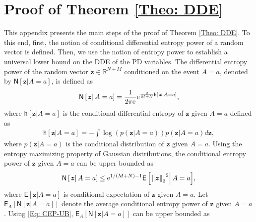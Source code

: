 \documentclass[10pt,twocolumn,twoside]{IEEEtran}
\begin{document}
\section{Proof of Theorem \ref{Theo: DDE}}\label{App: DDE}

This appendix presents the main steps of the proof of Theorem \ref{Theo: DDE}. To this end, first, the notion of conditional differential entropy power of a random vector is defined. Then, we use the notion of entropy power to establish a universal lower bound on the DDE of the PD variables. The differential entropy power of the random vector ${\ensuremath{\boldsymbol{{z}}}}\in {\ensuremath{{\ensuremath{\mathbb{{R}}}}}}^{N+M} $ conditioned on the event $A=a$, denoted by ${\ensuremath{\mathsf{N}\left[\left.{{\ensuremath{\boldsymbol{{z}}}}}\right|{A=a}\right]}}$, is defined as
\begin{eqnarray}
{\ensuremath{\mathsf{N}\left[\left.{{\ensuremath{\boldsymbol{{z}}}}}\right|{A=a}\right]}}=\frac{1}{{2\pi {\ensuremath{{\rm e}^{{}}}}}}{\ensuremath{{\rm e}^{{\frac{2}{M+N}{\ensuremath{\mathsf{h}\left[\left.{{\ensuremath{\boldsymbol{{z}}}}}\right|{A=a}\right]}}}}}},\nonumber
\end{eqnarray}
where ${\ensuremath{\mathsf{h}\left[\left.{{\ensuremath{\boldsymbol{{z}}}}}\right|{A=a}\right]}}$ is the conditional differential entropy of ${\ensuremath{\boldsymbol{{z}}}}$ given  $A=a$ defined as
\begin{eqnarray}
{\ensuremath{\mathsf{h}\left[\left.{{\ensuremath{\boldsymbol{{z}}}}}\right|{A=a}\right]}}=-\int{\ensuremath{\log{\left({{p{\left({\left.{\ensuremath{\boldsymbol{{z}}}}\right|A=a}\right)}}}\right)}}}p{\left({\left.{\ensuremath{\boldsymbol{{z}}}}\right|A=a}\right)}d{\ensuremath{\boldsymbol{{z}}}},\nonumber
\end{eqnarray}
where $p{\left({\left.{\ensuremath{\boldsymbol{{z}}}}\right|A=a}\right)}$ is the conditional distribution of ${\ensuremath{\boldsymbol{{z}}}}$ given $A=a$.
Using the entropy maximizing property of Gaussian distributions, the conditional entropy power of ${\ensuremath{\boldsymbol{{z}}}}$ given $A=a$ can be upper bounded \cite{NE04} as
\begin{eqnarray}\label{Eq: CEP-UB}
{\ensuremath{\mathsf{N}\left[\left.{{\ensuremath{\boldsymbol{{z}}}}}\right|{A=a}\right]}}\leq {\ensuremath{{\rm e}^{{1/{\left({M+N}\right)}-1}}}}{\ensuremath{\mathsf{E}\left[\left.{{\left\Vert{{\ensuremath{\boldsymbol{{z}}}}}\right\Vert_{{2}}}^2}\right|{A=a}\right]}},
\end{eqnarray}
where ${\ensuremath{\mathsf{E}\left[\left.{{\ensuremath{\boldsymbol{{z}}}}}\right|{A=a}\right]}}$ is conditional expectation of ${\ensuremath{\boldsymbol{{z}}}}$ given $A=a$. Let $\mathsf{E}_A\left[{\ensuremath{\mathsf{N}\left[\left.{{\ensuremath{\boldsymbol{{z}}}}}\right|{A=a}\right]}}\right]$ denote the average conditional entropy power of ${\ensuremath{\boldsymbol{{z}}}}$ given $A=a$. Using \eqref{Eq: CEP-UB}, $\mathsf{E}_A\left[{\ensuremath{\mathsf{N}\left[\left.{{\ensuremath{\boldsymbol{{z}}}}}\right|{A=a}\right]}}\right]$ can be upper bounded as
\end{document}
